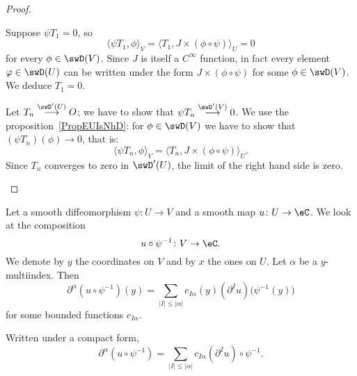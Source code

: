 \begin{proof}
\begin{subproof}

            Suppose \( \psi T_1=0\), so
            \begin{equation}
                \langle \psi T_1, \phi\rangle_V =\langle T_1, J\times (\phi\circ\psi)\rangle_U=0
            \end{equation}
            for every \( \phi\in \swD(V)\). Since \( J\) is itself a \(  C^{\infty}\) function, in fact every element \( \varphi\in \swD(U)\) can be written under the form \( J\times (\phi\circ\psi)\) for some \( \phi\in\swD(V)\). We deduce \( T_1=0\).


            Let \( T_n\stackrel{\swD'(U)}{\longrightarrow}O\); we have to show that \( \psi T_n\stackrel{\swD'(V)}{\longrightarrow}0\). We use the proposition~\ref{PropEUIsNhD}: for \( \phi\in\swD(V)\) we have to show that \( (\psi T_n)(\phi)\to 0\), that is:
            \begin{equation}
                \langle \psi T_n, \phi\rangle_V=\langle T_n, J\times (\phi\circ\psi)\rangle_U.
            \end{equation}
            Since \( T_n\) converges to zero in \( \swD'(U)\), the limit of the right hand side is zero.
    \end{subproof}
\end{proof}

\begin{lemma}       \label{LEMooJHFUooWdAlar}
    Let a smooth diffeomorphism \( \psi\colon U\to V\) and a smooth map \( u\colon U\to \eC\). We look at the composition
    \begin{equation}
        u\circ\psi^{-1}\colon V\to \eC.
    \end{equation}
    We denote by \( y\) the coordinates on \( V\) and by \( x\) the ones on \( U\). Let \( \alpha\) be a \( y\)-multiindex. Then
    \begin{equation}
        \partial^{\alpha}(u\circ\psi^{-1})(y)=\sum_{| I |\leq | \alpha |}c_{I \alpha}(y)(\partial^{I}u)\big( \psi^{-1}(y) \big)
    \end{equation}
    for some bounded functions \( c_{I \alpha}\).

    Written under a compact form,
    \begin{equation}
        \partial^{\alpha}(u\circ\psi^{-1})=\sum_{| I |\leq | \alpha |}c_{I \alpha}(\partial^Iu)\circ\psi^{-1}.
    \end{equation}
\end{lemma}

